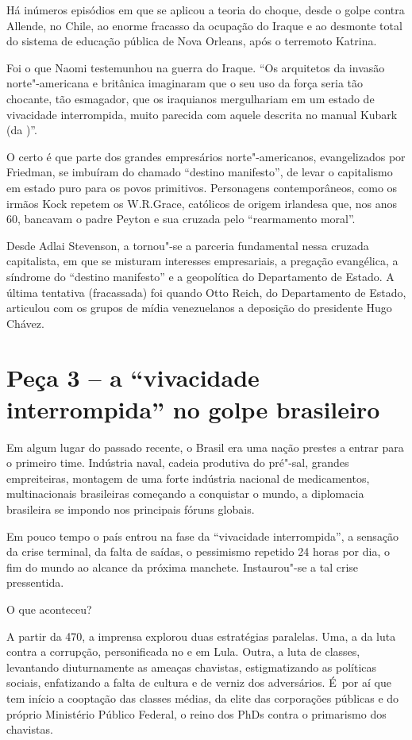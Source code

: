 Há inúmeros episódios em que se aplicou a teoria do choque, desde o
golpe contra Allende, no Chile, ao enorme fracasso da ocupação do Iraque
e ao desmonte total do sistema de educação pública de Nova Orleans, após
o terremoto Katrina.

Foi o que Naomi testemunhou na guerra do Iraque. ``Os arquitetos da
invasão norte"-americana e britânica imaginaram que o seu uso da força
seria tão chocante, tão esmagador, que os iraquianos mergulhariam em um
estado de vivacidade interrompida, muito parecida com aquele descrita no
manual Kubark (da )''.

O certo é que parte dos grandes empresários norte"-americanos,
evangelizados por Friedman, se imbuíram do chamado ``destino
manifesto'', de levar o capitalismo em estado puro para os povos
primitivos. Personagens contemporâneos, como os irmãos Kock repetem os
W.R.Grace, católicos de origem irlandesa que, nos anos 60, bancavam o
padre Peyton e sua cruzada pelo ``rearmamento moral''.

Desde Adlai Stevenson, a  tornou"-se a parceria fundamental nessa
cruzada capitalista, em que se misturam interesses empresariais, a
pregação evangélica, a síndrome do ``destino manifesto'' e a geopolítica
do Departamento de Estado. A última tentativa (fracassada) foi quando
Otto Reich, do Departamento de Estado, articulou com os grupos de mídia
venezuelanos a deposição do presidente Hugo Chávez.

\section{Peça 3 -- a ``vivacidade interrompida'' no golpe brasileiro}

Em algum lugar do passado recente, o Brasil era uma nação prestes a
entrar para o primeiro time. Indústria naval, cadeia produtiva do
pré"-sal, grandes empreiteiras, montagem de uma forte indústria nacional
de medicamentos, multinacionais brasileiras começando a conquistar o
mundo, a diplomacia brasileira se impondo nos principais fóruns globais.

Em pouco tempo o país entrou na fase da ``vivacidade interrompida'', a
sensação da crise terminal, da falta de saídas, o pessimismo repetido 24
horas por dia, o fim do mundo ao alcance da próxima manchete.
Instaurou"-se a tal crise pressentida.

O que aconteceu?

A partir da  470, a imprensa explorou duas estratégias paralelas. Uma,
a da luta contra a corrupção, personificada no  e em Lula. Outra, a
luta de classes, levantando diuturnamente as ameaças chavistas,
estigmatizando as políticas sociais, enfatizando a falta de cultura e de
verniz dos adversários. É~por aí que tem início a cooptação das classes
médias, da elite das corporações públicas e do próprio Ministério
Público Federal, o reino dos PhDs contra o primarismo dos chavistas.

